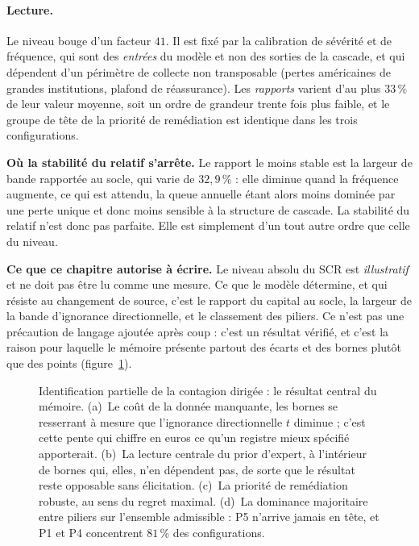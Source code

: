 \paragraph{Lecture.} Le niveau bouge d'un facteur $41$. Il est fixé par la
calibration de sévérité et de fréquence, qui sont des \emph{entrées} du modèle et non des
sorties de la cascade, et qui dépendent d'un périmètre de collecte non transposable
(pertes américaines de grandes institutions, plafond de réassurance). Les
\emph{rapports} varient d'au plus $33\,\%$ de leur valeur moyenne, soit un ordre de
grandeur trente fois plus faible, et le groupe de tête de la priorité de
remédiation est identique dans les trois configurations.

\begin{attention}
\textbf{Où la stabilité du relatif s'arrête.} Le rapport le moins
stable est la largeur de bande rapportée au socle, qui varie de $32{,}9\,\%$ : elle
diminue quand la fréquence augmente, ce qui est attendu, la queue annuelle étant alors
moins dominée par une perte unique et donc moins sensible à la structure de cascade. La
stabilité du relatif n'est donc pas parfaite. Elle est simplement d'un tout autre ordre
que celle du niveau.
\end{attention}

\begin{cle}
\textbf{Ce que ce chapitre autorise à écrire.} Le niveau absolu du SCR est
\emph{illustratif} et ne doit pas être lu comme une mesure. Ce que le modèle détermine,
et qui résiste au changement de source, c'est le rapport du capital au socle, la largeur
de la bande d'ignorance directionnelle, et le classement des piliers. Ce n'est pas une
précaution de langage ajoutée après coup : c'est un résultat vérifié, et c'est la raison
pour laquelle le mémoire présente partout des écarts et des bornes plutôt que des points
(figure~\ref{fig:partielle}).
\end{cle}

\begin{figure}[htbp]
  \centering
  \caption{Identification partielle de la contagion dirigée : le
résultat central du mémoire. (a)~Le coût de la donnée manquante, les bornes se
resserrant à mesure que l'ignorance directionnelle $t$ diminue ; c'est cette pente qui chiffre
en euros ce qu'un registre mieux spécifié apporterait. (b)~La lecture centrale du prior
d'expert, à l'intérieur de bornes qui, elles, n'en dépendent pas, de sorte que le résultat reste
opposable sans élicitation. (c)~La priorité de remédiation robuste, au sens du regret
maximal. (d)~La dominance majoritaire entre piliers sur l'ensemble admissible : P5
n'arrive jamais en tête, et P1 et P4 concentrent $81\,\%$ des configurations.}
  \label{fig:partielle}
\end{figure}

